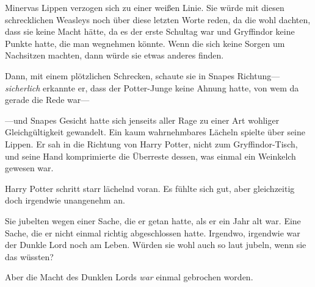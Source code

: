 Minervas Lippen verzogen sich zu einer weißen Linie. Sie würde mit diesen schrecklichen Weasleys noch über diese letzten Worte reden, da die wohl dachten, dass sie keine Macht hätte, da es der erste Schultag war und Gryffindor keine Punkte hatte, die man wegnehmen könnte. Wenn die sich keine Sorgen um Nachsitzen machten, dann würde sie etwas anderes finden.

Dann, mit einem plötzlichen Schrecken, schaute sie in Snapes Richtung—\emph{sicherlich} erkannte er, dass der Potter-Junge keine Ahnung hatte, von wem da gerade die Rede war—

—und Snapes Gesicht hatte sich jenseits aller Rage zu einer Art wohliger Gleichgültigkeit gewandelt. Ein kaum wahrnehmbares Lächeln spielte über seine Lippen. Er sah in die Richtung von Harry Potter, nicht zum Gryffindor-Tisch, und seine Hand komprimierte die Überreste dessen, was einmal ein Weinkelch gewesen war.

\later

Harry Potter schritt starr lächelnd voran. Es fühlte sich gut, aber gleichzeitig doch irgendwie unangenehm an.

Sie jubelten wegen einer Sache, die er getan hatte, als er ein Jahr alt war. Eine Sache, die er nicht einmal richtig abgeschlossen hatte. Irgendwo, irgendwie war der Dunkle Lord noch am Leben. Würden sie wohl auch so laut jubeln, wenn sie das wüssten?

Aber die Macht des Dunklen Lords \emph{war} einmal gebrochen worden.

